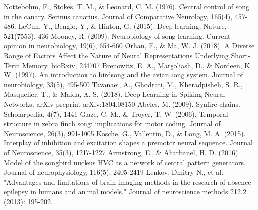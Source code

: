 \documentclass[draft,12pt,oneside]{CUNY_PhD}
\begin{document}
\begin{thebibliography}{22}
Nottebohm, F., Stokes, T. M., \& Leonard, C. M. (1976). Central control of song in the canary, Serinus canarius. Journal of Comparative Neurology, 165(4), 457-486.
LeCun, Y., Bengio, Y., \& Hinton, G. (2015). Deep learning. Nature, 521(7553), 436
Mooney, R. (2009). Neurobiology of song learning. Current opinion in neurobiology, 19(6), 654-660
Orhan, E., \& Ma, W. J. (2018). A Diverse Range of Factors Affect the Nature of Neural Representations Underlying Short-Term Memory. bioRxiv, 244707
Brenowitz, E. A., Margoliash, D., \& Nordeen, K. W. (1997). An introduction to birdsong and the avian song system. Journal of neurobiology, 33(5), 495-500
Tavanaei, A., Ghodrati, M., Kheradpisheh, S. R., Masquelier, T., \& Maida, A. S. (2018). Deep Learning in Spiking Neural Networks. arXiv preprint arXiv:1804.08150
Abeles, M. (2009). Synfire chains. Scholarpedia, 4(7), 1441
Glaze, C. M., \& Troyer, T. W. (2006). Temporal structure in zebra finch song: implications for motor coding. Journal of Neuroscience, 26(3), 991-1005
Kosche, G., Vallentin, D., \& Long, M. A. (2015). Interplay of inhibition and excitation shapes a premotor neural sequence. Journal of Neuroscience, 35(3), 1217-1227
Armstrong, E., \& Abarbanel, H. D. (2016). Model of the songbird nucleus HVC as a network of central pattern generators. Journal of neurophysiology, 116(5), 2405-2419
Lenkov, Dmitry N., et al. "Advantages and limitations of brain imaging methods in the research of absence epilepsy in humans and animal models." Journal of neuroscience methods 212.2 (2013): 195-202.
\end{thebibliography}
\end{document}
